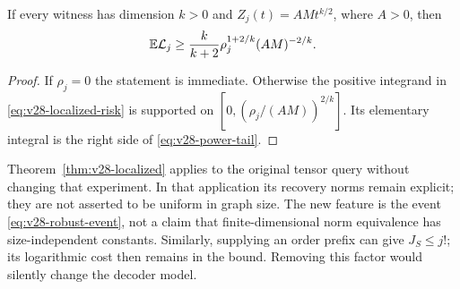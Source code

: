 \begin{corollary}\label{cor:v28-power-tail}
If every witness has dimension $k>0$ and $Z_j(t)=AMt^{k/2}$, where
$A>0$, then
\begin{equation}\label{eq:v28-power-tail}
       \mathbb E\mathcal L_j\ge
       \frac{k}{k+2}\rho_j^{1+2/k}(AM)^{-2/k}.
\end{equation}
\end{corollary}
\begin{proof}
If $\rho_j=0$ the statement is immediate. Otherwise the positive
integrand in \eqref{eq:v28-localized-risk} is supported on
$[0,(\rho_j/(AM))^{2/k}]$. Its elementary integral is the right
side of \eqref{eq:v28-power-tail}.
\end{proof}

Theorem~\ref{thm:v28-localized} applies to the original tensor query
without changing that experiment. In that application its recovery
norms remain explicit; they are not asserted to be uniform in graph
size. The new feature is the event \eqref{eq:v28-robust-event}, not a
claim that finite-dimensional norm equivalence has size-independent
constants. Similarly, supplying an order prefix can give
$J_S\le j!$; its logarithmic cost then remains in the bound. Removing
this factor would silently change the decoder model.
